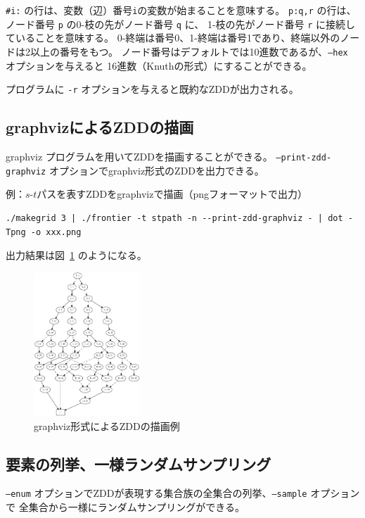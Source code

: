 \documentclass{jsarticle}
\begin{document}
\texttt{\#i:} の行は、変数（辺）番号\texttt{i}の変数が始まることを意味する。
\texttt{p:q,r} の行は、ノード番号 \texttt{p} の0-枝の先がノード番号 \texttt{q} に、
1-枝の先がノード番号 \texttt{r} に接続していることを意味する。
0-終端は番号0、1-終端は番号1であり、終端以外のノードは2以上の番号をもつ。
ノード番号はデフォルトでは10進数であるが、\texttt{--hex} オプションを与えると
16進数（Knuthの形式）にすることができる。

プログラムに \texttt{-r} オプションを与えると既約なZDDが出力される。

\subsection{graphvizによるZDDの描画}

graphviz プログラムを用いてZDDを描画することができる。
\texttt{--print-zdd-graphviz} オプションでgraphviz形式のZDDを出力できる。

例：$s$-$t$パスを表すZDDをgraphvizで描画（pngフォーマットで出力）

\begin{verbatim}
./makegrid 3 | ./frontier -t stpath -n --print-zdd-graphviz - | dot -Tpng -o xxx.png
\end{verbatim}

出力結果は図~\ref{fig:zdd_example} のようになる。

\begin{figure}[h]
  \begin{center}
    \includegraphics[width=40mm]{zdd_example.eps}
  \end{center}
  \caption{graphviz形式によるZDDの描画例}
  \label{fig:zdd_example}
\end{figure}

\subsection{要素の列挙、一様ランダムサンプリング}

\texttt{--enum} オプションでZDDが表現する集合族の全集合の列挙、\texttt{--sample} オプションで
全集合から一様にランダムサンプリングができる。
\end{document}
